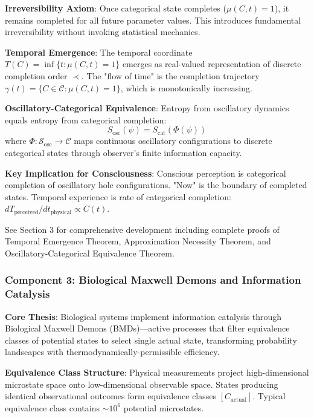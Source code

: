 \documentclass[11pt,onecolumn]{article}
\begin{document}
\textbf{Irreversibility Axiom}: Once categorical state completes ($\mu(C,t) = 1$), it remains completed for all future parameter values. This introduces fundamental irreversibility without invoking statistical mechanics.

\textbf{Temporal Emergence}: The temporal coordinate $T(C) = \inf\{t : \mu(C,t) = 1\}$ emerges as real-valued representation of discrete completion order $\prec$. The "flow of time" is the completion trajectory $\gamma(t) = \{C \in \mathcal{C} : \mu(C,t) = 1\}$, which is monotonically increasing.

\textbf{Oscillatory-Categorical Equivalence}: Entropy from oscillatory dynamics equals entropy from categorical completion:
\begin{equation}
S_{\text{osc}}(\psi) = S_{\text{cat}}(\Phi(\psi))
\end{equation}
where $\Phi: \mathcal{S}_{\text{osc}} \to \mathcal{C}$ maps continuous oscillatory configurations to discrete categorical states through observer's finite information capacity.

\textbf{Key Implication for Consciousness}: Conscious perception is categorical completion of oscillatory hole configurations. "Now" is the boundary of completed states. Temporal experience is rate of categorical completion: $dT_{\text{perceived}}/dt_{\text{physical}} \propto \dot{C}(t)$.

See Section 3 for comprehensive development including complete proofs of Temporal Emergence Theorem, Approximation Necessity Theorem, and Oscillatory-Categorical Equivalence Theorem.

\subsubsection{Component 3: Biological Maxwell Demons and Information Catalysis}

\textbf{Core Thesis}: Biological systems implement information catalysis through Biological Maxwell Demons (BMDs)---active processes that filter equivalence classes of potential states to select single actual state, transforming probability landscapes with thermodynamically-permissible efficiency.

\textbf{Equivalence Class Structure}: Physical measurements project high-dimensional microstate space onto low-dimensional observable space. States producing identical observational outcomes form equivalence classes $[C_{\text{actual}}]$. Typical equivalence class contains $\sim 10^6$ potential microstates.
\end{document}
